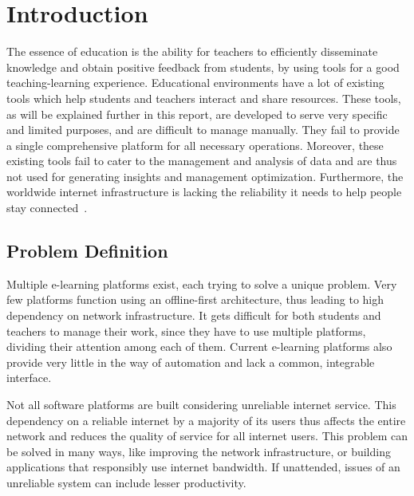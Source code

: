 \chapter{\centering Introduction}

\pagestyle{fancy}
\lhead{}
\rhead{}
\cfoot{}
\rfoot{\thepage}
\renewcommand{\headrulewidth}{2pt}
\renewcommand{\footrulewidth}{0.8pt}


The essence of education is the ability for teachers to efficiently 
disseminate knowledge and obtain positive feedback from students, by 
using tools for a good teaching-learning experience. 
Educational environments have a lot of existing tools which help students and teachers interact and share resources. These tools, as will be explained further in this report, are developed to serve very specific and limited purposes, and are difficult to manage manually. They fail to provide a 
single comprehensive platform for all necessary operations. 
Moreover, these existing tools fail to cater to the management and analysis of data and are thus not used for generating insights and management optimization. 
Furthermore, the worldwide internet infrastructure is lacking the reliability it needs to help people stay connected~\cite{WebF20}.

\section{Problem Definition}

Multiple e-learning platforms exist, each trying to solve a unique problem. 
Very few platforms function using an offline-first architecture, thus leading to 
high dependency on network infrastructure. 
It gets difficult for both students and teachers to manage their work, 
since they have to use multiple platforms, dividing their attention among each of them. 
Current e-learning platforms also provide very little in the way of automation and lack a common, integrable interface.

Not all software platforms are built considering unreliable internet service. 
This dependency on a reliable internet by a majority of its users thus affects the entire network and reduces the quality of service for all internet users. This problem can be solved in many ways, 
like improving the network infrastructure, or building applications that responsibly use internet bandwidth. If unattended, issues of an unreliable system can include lesser productivity.

